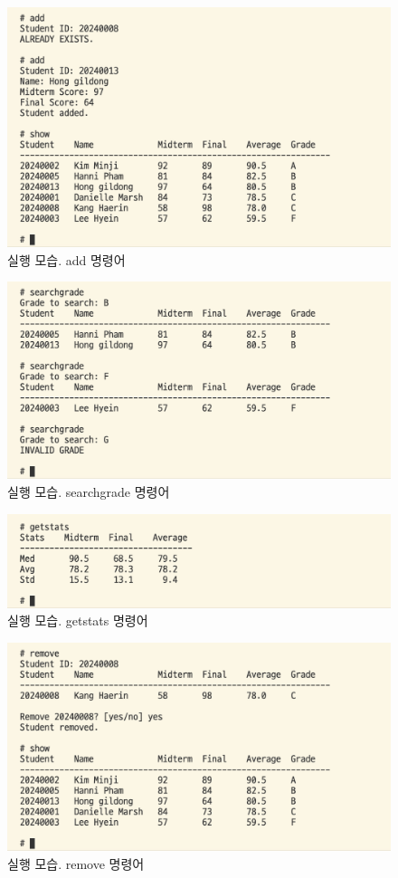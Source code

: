 \documentclass{article}
\begin{document}
\begin{figure}
  \includegraphics[width=\textwidth]{screenshots/5.png}
  \caption{실행 모습. add 명령어}
  \label{img:5}
\end{figure}
\begin{figure}
  \includegraphics[width=\textwidth]{screenshots/6.png}
  \caption{실행 모습. searchgrade 명령어}
  \label{img:6}
\end{figure}
\begin{figure}
  \includegraphics[width=\textwidth]{screenshots/7.png}
  \caption{실행 모습. getstats 명령어}
  \label{img:7}
\end{figure}
\begin{figure}
  \includegraphics[width=\textwidth]{screenshots/8.png}
  \caption{실행 모습. remove 명령어}
  \label{img:8}
\end{figure}
\end{document}
